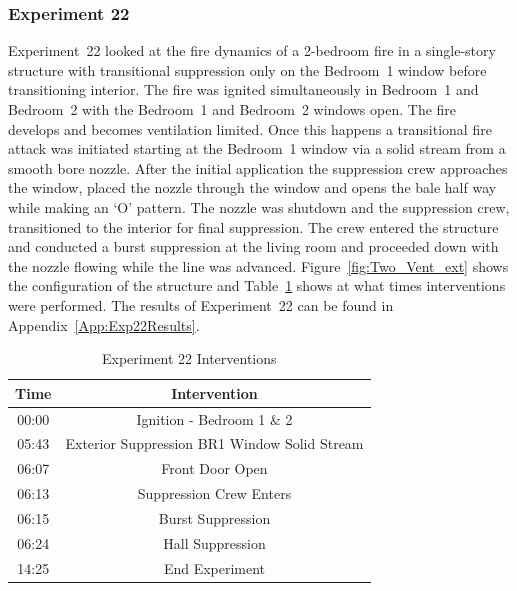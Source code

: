 \documentclass[12pt,oneside]{book}
\begin{document}
\FloatBarrier

\subsubsection{Experiment 22}
Experiment~22 looked at the fire dynamics of a 2-bedroom fire in a single-story structure with transitional suppression only on the Bedroom~1 window before transitioning interior. The fire was ignited simultaneously in Bedroom~1 and Bedroom~2 with the Bedroom~1 and Bedroom~2 windows open. The fire develops and becomes ventilation limited. Once this happens a transitional fire attack was initiated starting at the Bedroom~1 window via a solid stream from a smooth bore nozzle. After the initial application the suppression crew approaches the window, placed the nozzle through the window and opens the bale half way while making an `O' pattern. The nozzle was shutdown and the suppression crew, transitioned to the interior for final suppression. The crew entered the structure and conducted a burst suppression at the living room and proceeded down with the nozzle flowing while the line was advanced. Figure~\ref{fig:Two_Vent_ext} shows the configuration of the structure and Table~\ref{Table:Exp22Interventions} shows at what times interventions were performed. The results of Experiment~22 can be found in Appendix~\ref{App:Exp22Results}. 


\begin{table}[H]
	\centering
	\caption{Experiment 22 Interventions}
	\begin{tabular}{|c|c|} 
		\hline
		Time & Intervention \\ \hline \hline
		00:00 & Ignition - Bedroom 1 \& 2 \\ \hline
		05:43 & Exterior Suppression BR1 Window Solid Stream \\ \hline
		06:07 & Front Door Open \\ \hline
		06:13 & Suppression Crew Enters\\ \hline
		06:15 & Burst Suppression \\ \hline 
		06:24 & Hall Suppression \\ \hline
		14:25 & End Experiment\\ \hline
	\end{tabular}
	\label{Table:Exp22Interventions}
\end{table}
\end{document}
